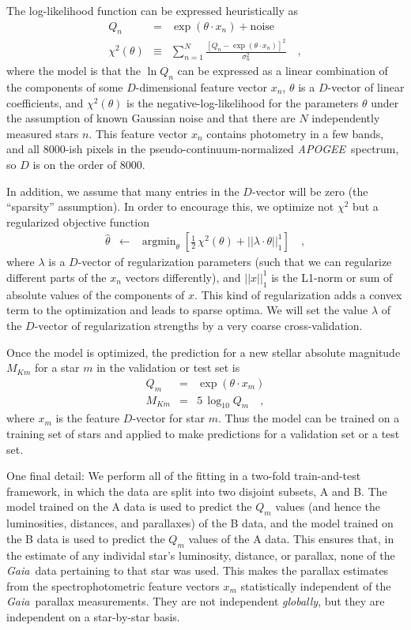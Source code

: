 \documentclass[modern]{aastex62}
\newcommand{\acronym}[1]{{\small{#1}}}
\newcommand{\project}[1]{\textsl{#1}}
\newcommand{\apogee}{\project{\acronym{APOGEE}}}
\newcommand{\gaia}{\project{Gaia}}
\DeclareMathOperator*{\argmin}{argmin}
\begin{document}
The log-likelihood function can be expressed heuristically as
\begin{eqnarray}
Q_n &=& \exp(\theta\cdot x_n) + \mbox{noise}
\\
\chi^2(\theta) &\equiv& \sum_{n=1}^N \frac{[Q_n - \exp(\theta\cdot x_n)]^2}{\sigma_n^2}
\quad ,
\end{eqnarray}
where
the model is that the $\ln Q_n$ can be expressed as a linear combination of the components
of some $D$-dimensional feature vector $x_n$,
$\theta$ is a $D$-vector of linear coefficients,
and $\chi^2(\theta)$ is the negative-log-likelihood for the parameters $\theta$
under the assumption of known Gaussian noise and
that there are $N$ independently measured stars $n$.
This feature vector $x_n$ contains photometry in a few bands, and all 8000-ish pixels
in the pseudo-continuum-normalized \apogee\ spectrum, so $D$ is on the order of 8000.

In addition, we assume that many entries in the $D$-vector will be zero
(the ``sparsity'' assumption).
In order to encourage this, we optimize not $\chi^2$ but a regularized objective function
\begin{eqnarray}
\hat{\theta} &\leftarrow& \argmin_{\theta}\left[\frac{1}{2}\,\chi^2(\theta) + ||\lambda\cdot\theta||_1^1\right]
\quad ,
\end{eqnarray}
where
$\lambda$ is a $D$-vector of regularization parameters (such that we can regularize
different parts of the $x_n$ vectors differently),
and $||x||_1^1$ is the L1-norm or sum of absolute values of the components of $x$.
This kind of regularization adds a convex term to the optimization and leads to
sparse optima.
We will set the value $\lambda$ of the $D$-vector of regularization strengths by a
very coarse cross-validation.

Once the model is optimized, the prediction for a new stellar absolute magnitude
$M_{Km}$ for a star $m$ in the validation or test set is
\begin{eqnarray}
Q_m &=& \exp(\theta\cdot x_m)
\\
M_{Km} &=& 5\,\log_{10} Q_m
\quad ,
\end{eqnarray}
where $x_m$ is the feature $D$-vector for star $m$.
Thus the model can be trained on a training set of stars and applied to make
predictions for a validation set or a test set.

One final detail: We perform all of the fitting in a two-fold train-and-test framework,
in which the data are split into two disjoint subsets, A and B.
The model trained on the A data is used to predict the $Q_m$ values (and hence
the luminosities, distances, and parallaxes) of the B data,
and the model trained on the B data is used to 
predict the $Q_m$ values of the A data.
This ensures that, in the estimate of any individal star's luminosity, distance,
or parallax, none of the \gaia\ data pertaining to that star was used.
This makes the parallax estimates from the spectrophotometric feature vectors
$x_m$ statistically independent of the \gaia\ parallax measurements.
They are not independent \emph{globally}, but they are independent on a
star-by-star basis.
\end{document}
